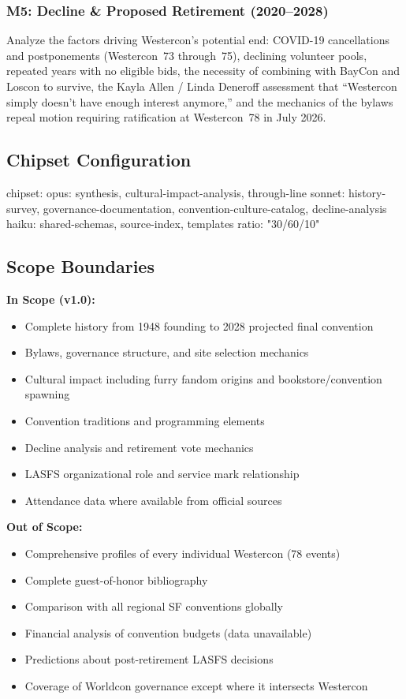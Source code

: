 \documentclass[11pt,letterpaper]{article}
\begin{document}
\subsubsection{M5: Decline \& Proposed Retirement (2020--2028)}

Analyze the factors driving Westercon's potential end: COVID-19 cancellations and postponements (Westercon~73 through~75), declining volunteer pools, repeated years with no eligible bids, the necessity of combining with BayCon and Loscon to survive, the Kayla Allen / Linda Deneroff assessment that ``Westercon simply doesn't have enough interest anymore,'' and the mechanics of the bylaws repeal motion requiring ratification at Westercon~78 in July 2026.

\subsection{Chipset Configuration}

\begin{asciibox}
chipset:
  opus: synthesis, cultural-impact-analysis, through-line
  sonnet: history-survey, governance-documentation,
          convention-culture-catalog, decline-analysis
  haiku: shared-schemas, source-index, templates
ratio: "30/60/10"
\end{asciibox}

\subsection{Scope Boundaries}

\textbf{In Scope (v1.0):}
\begin{itemize}[leftmargin=2em]
  \item Complete history from 1948 founding to 2028 projected final convention
  \item Bylaws, governance structure, and site selection mechanics
  \item Cultural impact including furry fandom origins and bookstore/convention spawning
  \item Convention traditions and programming elements
  \item Decline analysis and retirement vote mechanics
  \item LASFS organizational role and service mark relationship
  \item Attendance data where available from official sources
\end{itemize}

\textbf{Out of Scope:}
\begin{itemize}[leftmargin=2em]
  \item Comprehensive profiles of every individual Westercon (78 events)
  \item Complete guest-of-honor bibliography
  \item Comparison with all regional SF conventions globally
  \item Financial analysis of convention budgets (data unavailable)
  \item Predictions about post-retirement LASFS decisions
  \item Coverage of Worldcon governance except where it intersects Westercon
\end{itemize}
\end{document}
